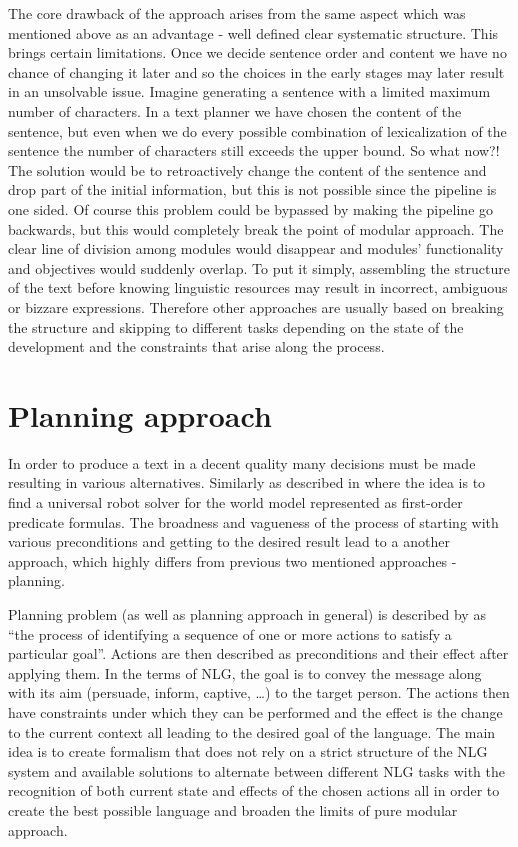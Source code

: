 The core drawback of the approach arises from the same aspect which was mentioned above as an advantage - well defined clear systematic structure. This brings certain limitations. Once we decide sentence order and content we have no chance of changing it later and so the choices in the early stages may later result in an unsolvable issue. Imagine generating a sentence with a limited maximum number of characters. In a text planner we have chosen the content of the sentence, but even when we do every possible combination of lexicalization of the sentence the number of characters still exceeds the upper bound. So what now?! The solution would be to retroactively change the content of the sentence and drop part of the initial information, but this is not possible since the pipeline is one sided. Of course this problem could be bypassed by making the pipeline go backwards, but this would completely break the point of modular approach. The clear line of division among modules would disappear and modules' functionality and objectives would suddenly overlap. To put it simply, assembling the structure of the text before knowing linguistic resources may result in incorrect, ambiguous or bizzare expressions. Therefore other approaches are usually based on breaking the structure and skipping to different tasks depending on the state of the development and the constraints that arise along the process.


\section{Planning approach}
In order to produce a text in a decent quality many decisions must be made resulting in various alternatives. Similarly as described in \cite{fikes1971strips} where the idea is to find a universal robot solver for the world model represented as first-order predicate formulas. The broadness and vagueness of the process of starting with various preconditions and getting to the desired result lead to a another approach, which highly differs from previous two mentioned approaches - planning.

Planning problem (as well as planning approach in general) is described by \cite{gatt2018survey} as “the process of identifying a sequence of one or more actions to satisfy a particular goal”. Actions are then described as preconditions and their effect after applying them. In the terms of NLG, the goal is to convey the message along with its aim (persuade, inform, captive, …) to the target person. The actions then have constraints under which they can be performed and the effect is the change to the current context all leading to the desired goal of the language. The main idea is to create formalism that does not rely on a strict structure of the NLG system and available solutions to alternate between different NLG tasks with the recognition of both current state and effects of the chosen actions all in order to create the best possible language and broaden the limits of pure modular approach. 

